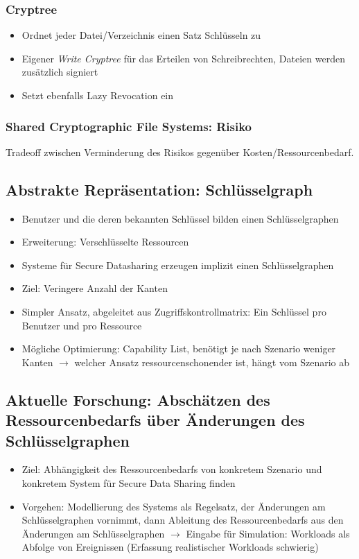\subsubsection{Cryptree}
\begin{itemize}
	\item Ordnet jeder Datei/Verzeichnis einen Satz Schlüsseln zu
	\item Eigener \textit{Write Cryptree} für das Erteilen von Schreibrechten, Dateien werden zusätzlich signiert
	\item Setzt ebenfalls Lazy Revocation ein
\end{itemize}

\subsubsection{Shared Cryptographic File Systems: Risiko}
Tradeoff zwischen Verminderung des Risikos gegenüber Kosten/Ressourcenbedarf.


\subsection{Abstrakte Repräsentation: Schlüsselgraph}
\begin{itemize}
	\item Benutzer und die deren bekannten Schlüssel bilden einen Schlüsselgraphen
	\item Erweiterung: Verschlüsselte Ressourcen
	\item Systeme für Secure Datasharing erzeugen implizit einen Schlüsselgraphen
	\item Ziel: Veringere Anzahl der Kanten
	\item Simpler Ansatz, abgeleitet aus Zugriffskontrollmatrix: Ein Schlüssel pro Benutzer und pro Ressource
	\item Mögliche Optimierung: Capability List, benötigt je nach Szenario weniger Kanten $\rightarrow$ welcher Ansatz ressourcenschonender ist, hängt vom Szenario ab
\end{itemize}


\subsection{Aktuelle Forschung: Abschätzen des Ressourcenbedarfs über Änderungen des Schlüsselgraphen}
\begin{itemize}
	\item Ziel: Abhängigkeit des Ressourcenbedarfs von konkretem Szenario und konkretem System für Secure Data Sharing finden
	\item Vorgehen: Modellierung des Systems als Regelsatz, der Änderungen am Schlüsselgraphen vornimmt, dann Ableitung des Ressourcenbedarfs aus den Änderungen am Schlüsselgraphen $\rightarrow$ Eingabe für Simulation: Workloads als Abfolge von Ereignissen (Erfassung realistischer Workloads schwierig)
\end{itemize}



